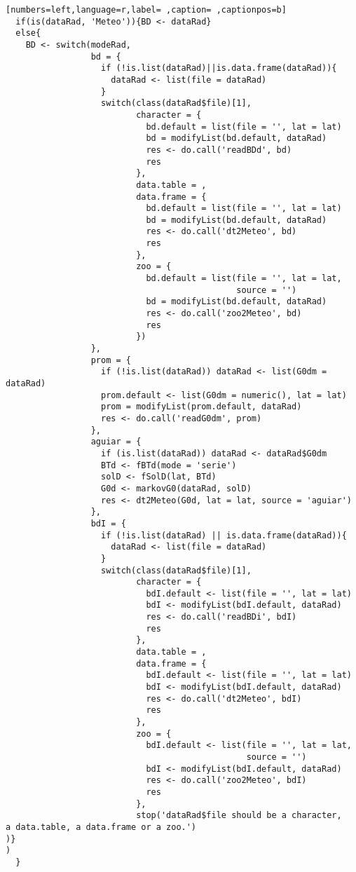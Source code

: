\begin{lstlisting}[numbers=left,language=r,label= ,caption= ,captionpos=b]
  if(is(dataRad, 'Meteo')){BD <- dataRad}
  else{
    BD <- switch(modeRad,
                 bd = {
                   if (!is.list(dataRad)||is.data.frame(dataRad)){
                     dataRad <- list(file = dataRad)
                   }
                   switch(class(dataRad$file)[1],
                          character = {
                            bd.default = list(file = '', lat = lat)
                            bd = modifyList(bd.default, dataRad)
                            res <- do.call('readBDd', bd)
                            res
                          },
                          data.table = ,
                          data.frame = {
                            bd.default = list(file = '', lat = lat)
                            bd = modifyList(bd.default, dataRad)
                            res <- do.call('dt2Meteo', bd)
                            res
                          },
                          zoo = {
                            bd.default = list(file = '', lat = lat,
                                              source = '')
                            bd = modifyList(bd.default, dataRad)
                            res <- do.call('zoo2Meteo', bd)
                            res
                          })
                 }, 
                 prom = {
                   if (!is.list(dataRad)) dataRad <- list(G0dm = dataRad)
                   prom.default <- list(G0dm = numeric(), lat = lat)
                   prom = modifyList(prom.default, dataRad)
                   res <- do.call('readG0dm', prom)
                 }, 
                 aguiar = {
                   if (is.list(dataRad)) dataRad <- dataRad$G0dm
                   BTd <- fBTd(mode = 'serie')
                   solD <- fSolD(lat, BTd)
                   G0d <- markovG0(dataRad, solD)
                   res <- dt2Meteo(G0d, lat = lat, source = 'aguiar')
                 }, 
                 bdI = {
                   if (!is.list(dataRad) || is.data.frame(dataRad)){
                     dataRad <- list(file = dataRad)
                   }
                   switch(class(dataRad$file)[1],
                          character = {
                            bdI.default <- list(file = '', lat = lat)
                            bdI <- modifyList(bdI.default, dataRad)
                            res <- do.call('readBDi', bdI)
                            res
                          },
                          data.table = ,
                          data.frame = {
                            bdI.default <- list(file = '', lat = lat)
                            bdI <- modifyList(bdI.default, dataRad)
                            res <- do.call('dt2Meteo', bdI)
                            res
                          },
                          zoo = {
                            bdI.default <- list(file = '', lat = lat,
                                                source = '')
                            bdI <- modifyList(bdI.default, dataRad)
                            res <- do.call('zoo2Meteo', bdI)
                            res
                          },
                          stop('dataRad$file should be a character,
a data.table, a data.frame or a zoo.')
)} 
)             
  }
  

\end{lstlisting}
